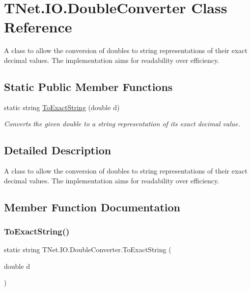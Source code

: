 \hypertarget{class_t_net_1_1_i_o_1_1_double_converter}{}\section{T\+Net.\+I\+O.\+Double\+Converter Class Reference}
\label{class_t_net_1_1_i_o_1_1_double_converter}


A class to allow the conversion of doubles to string representations of their exact decimal values. The implementation aims for readability over efficiency.  


\subsection*{Static Public Member Functions}
\begin{DoxyCompactItemize}
\item 
static string \mbox{\hyperlink{class_t_net_1_1_i_o_1_1_double_converter_aaa23e3bc74dda3861152b235db95609a}{To\+Exact\+String}} (double d)
\begin{DoxyCompactList}\small\item\em Converts the given double to a string representation of its exact decimal value. \end{DoxyCompactList}\end{DoxyCompactItemize}


\subsection{Detailed Description}
A class to allow the conversion of doubles to string representations of their exact decimal values. The implementation aims for readability over efficiency. 



\subsection{Member Function Documentation}
\mbox{\label{class_t_net_1_1_i_o_1_1_double_converter_aaa23e3bc74dda3861152b235db95609a}} 
\subsubsection{\texorpdfstring{To\+Exact\+String()}{ToExactString()}}
{\footnotesize\ttfamily static string T\+Net.\+I\+O.\+Double\+Converter.\+To\+Exact\+String (\begin{DoxyParamCaption}\item[{double}]{d }\end{DoxyParamCaption})\hspace{0.3cm}{\ttfamily [static]}}



